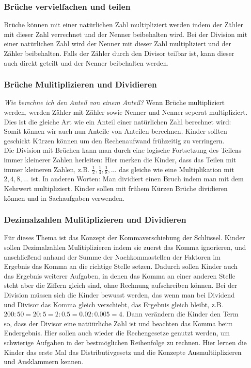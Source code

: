 \documentclass{article}
\begin{document}
\subsubsection*{Brüche vervielfachen und teilen}
Brüche können mit einer natürlichen Zahl multipliziert werden indem der Zähler mit dieser Zahl verrechnet und der Nenner beibehalten wird.
Bei der Division mit einer natürlichen Zahl wird der Nenner mit dieser Zahl multipliziert und der Zähler beibehalten.
Falls der Zähler durch den Divisor teilbar ist, kann dieser auch direkt geteilt und der Nenner beibehalten werden.
\subsubsection*{Brüche Mulitiplizieren und Dividieren}
\textit{Wie berechne ich den Anteil von einem Anteil?}
Wenn Brüche multipliziert werden, werden Zähler mit Zähler sowie Nenner und Nenner seperat multipliziert.
Dies ist die gleiche Art wie ein Anteil einer natürlichen Zahl berechnet wird: Somit können wir auch nun Anteile von Anteilen berechnen.
Kinder sollten geschickt Kürzen können um den Rechenaufwand frühzeitig zu verringern. \\
Die Division mit Brüchen kann man durch eine logische Fortsetzung des Teilens immer kleinerer Zahlen herleiten: Hier merken die Kinder, dass das Teilen mit immer kleineren Zahlen, z.B. $\frac{1}{2}, \frac{1}{4}, \frac{1}{8}, \ldots$ das gleiche wie eine Multiplikation mit $2, 4, 8, \ldots$ ist.
In anderen Worten: Man dividiert einen Bruch indem man mit dem Kehrwert multipliziert.
Kinder sollen mit frühem Kürzen Brüche dividieren können und in Sachaufgaben verwenden.
\subsubsection*{Dezimalzahlen Mulitiplizieren und Dividieren}
Für dieses Thema ist das Konzept der Kommaverschiebung der Schlüssel.
Kinder sollen Dezimalzahlen Mulitiplizieren indem sie zuerst das Komma ignorieren, und anschließend anhand der Summe der Nachkommastellen der Faktoren im Ergebnis das Komma an die richtige Stelle setzen.
Dadurch sollen Kinder auch das Ergebnis weiterer Aufgaben, in denen das Komma an einer anderen Stelle steht aber die Ziffern gleich sind, ohne Rechnung aufschreiben können.
Bei der Division müssen sich die Kinder bewusst werden, das wenn man bei Dividend und Divisor das Komma gleich verschiebt, das Ergebnis gleich bleibt, z.B. $200 : 50 = 20:5 = 2:0.5 = 0.02 : 0.005 = 4$.
Dann verändern die Kinder den Term so, dass der Divisor eine natüürliche Zahl ist und beachten das Komma beim Endergebnis.
Hier sollen auch wieder die Rechengesetze genutzt werden, um schwierige Aufgaben in der bestmöglichen Reihenfolge zu rechnen.
Hier lernen die Kinder das erste Mal das Distributivgesetz und die Konzepte Ausmultiiplizieren und Ausklammern kennen.
\end{document}
